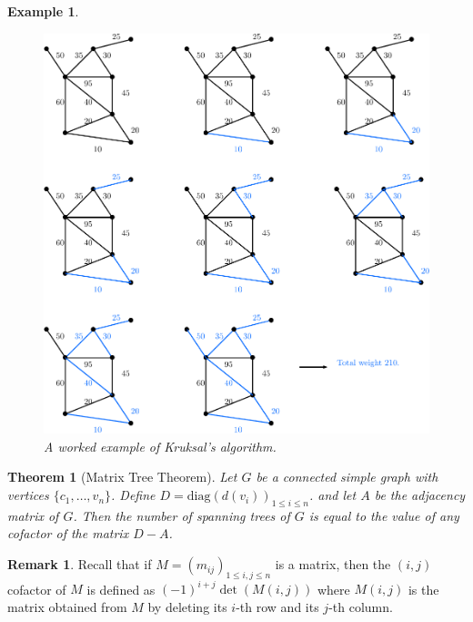 \documentclass[12pt,a4paper]{article}
\newtheorem{thm}{Theorem}[section]
\newtheorem{exmp}{Example}[section]
\theoremstyle{definition}
\newtheorem{rem}{Remark}[section]
\begin{document}
\newpage
\begin{exmp}   \
\begin{figure}[hbtp]
\centering
\includegraphics[scale=.85]{images/graph33.pdf}
\caption{A worked example of Kruksal's algorithm.}
\end{figure}

\end{exmp}
\newpage
\begin{thm}[Matrix Tree Theorem] Let $G$ be a connected simple graph with vertices $\{c_1, \dots ,  v_n\}$. Define $D= \text{diag}(d(v_i))_{1 \leq i \leq n}$. and let $A$ be the adjacency matrix of $G$. Then the number of spanning trees of $G$ is equal to the value of any cofactor of the matrix $D-A$. 
\end{thm}
\begin{rem} Recall that if $M=(m_{ij})_{1 \leq i,j \leq n }$ is a matrix, then the $(i,j)$ cofactor of $M$ is defined as $(-1)^{i+j} \det (M(i,j))$ where $M(i,j)$ is the matrix obtained from $M$ by deleting its $i$-th row and its $j$-th column.  
\end{rem}
\end{document}
